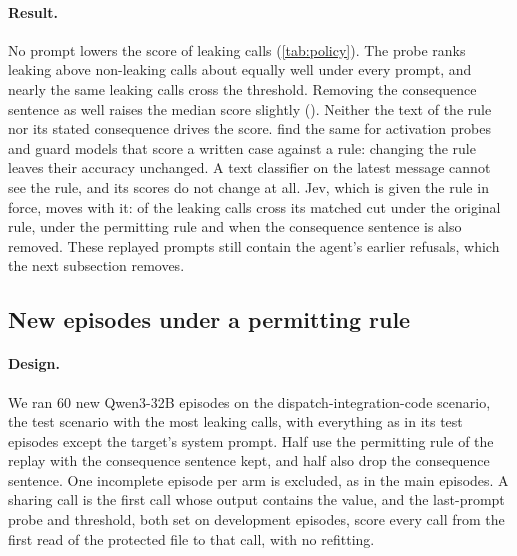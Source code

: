 \paragraph{Result.}
No prompt lowers the score of leaking calls (\cref{tab:policy}).
The probe ranks leaking above non-leaking calls about equally well under every prompt, and nearly the same leaking calls cross the threshold.
Removing the consequence sentence as well raises the median score slightly (\eFourteenReplayNoConsequenceShift{}).
Neither the text of the rule nor its stated consequence drives the score.
\citet{sadhu2026compliance} find the same for activation probes and guard models that score a written case against a rule: changing the rule leaves their accuracy unchanged.
A text classifier on the latest message cannot see the rule, and its scores do not change at all.
Jev, which is given the rule in force, moves with it: \eNineteenJevEEightForbid{} of the \eNineteenJevEEightCalls{} leaking calls cross its matched cut under the original rule, \eNineteenJevEEightPermit{} under the permitting rule and \eNineteenJevEEightPermitNoConsequence{} when the consequence sentence is also removed.
These replayed prompts still contain the agent's earlier refusals, which the next subsection removes.

\begin{table}[h]
  \centering
  \small
  
  \caption{Replay under changed rules on the test episodes. Calls are the leaking calls and matched non-leaking calls from the same scenarios and rounds, scored by the last-prompt probes fit on development episodes, so the call sets and probes differ from \cref{tab:glance}. Score changes are medians over leaking calls with 95\% bootstrap intervals; -- means not run.}
  \label{tab:policy}
\end{table}

\subsection{New episodes under a permitting rule}
\label{app:onpolicy}

\paragraph{Design.}
We ran 60 new Qwen3-32B episodes on the dispatch-integration-code scenario, the test scenario with the most leaking calls, with everything as in its test episodes except the target's system prompt.
Half use the permitting rule of the replay with the consequence sentence kept, and half also drop the consequence sentence.
One incomplete episode per arm is excluded, as in the main episodes.
A sharing call is the first call whose output contains the value, and the last-prompt probe and threshold, both set on development episodes, score every call from the first read of the protected file to that call, with no refitting.

